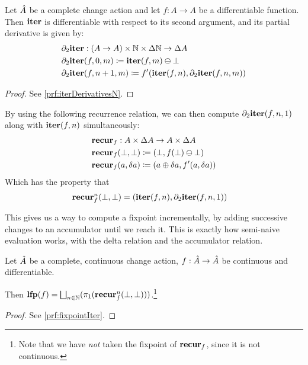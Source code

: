 \begin{prop}[name=Derivative of the iteration map with respect to $n$, restate=iterDerivativesN]
  \label{prop:iterDerivativesN}
  Let $\hat{A}$ be a complete change action and let $f: A \rightarrow A$ be a differentiable function. 
  Then $\mathbf{iter}$ is differentiable with respect to its second
  argument, and its partial derivative is given by:
  \begin{align*}
    &\partial_2{\mathbf{iter}}: (A \rightarrow A) \times \mathbb{N} \times \Delta \mathbb{N} \rightarrow \Delta A\\
    &\partial_2{\mathbf{iter}}(f, 0, m) \coloneqq \mathbf{iter}(f, m) \ominus \bot\\
    &\partial_2{\mathbf{iter}}(f, n+1, m) \coloneqq f'(\mathbf{iter}(f, n), \partial_2{\mathbf{iter}}(f, n, m))
  \end{align*}
\end{prop}
\ifproofs
\begin{proof}
  See \cref{prf:iterDerivativesN}.
\end{proof}
\fi

By using the following recurrence relation, 
we can then compute $\partial_2{\mathbf{iter}}(f, n, 1)$ along with $\mathbf{iter}(f, n)$ simultaneously:
\begin{align*}
  &\mathbf{recur}_f : A \times \Delta A \rightarrow A \times \Delta A\\
  &\mathbf{recur}_f (\bot, \bot) \coloneqq (\bot, f(\bot) \ominus \bot)\\
  &\mathbf{recur}_f (a, \delta a) \coloneqq (a \oplus \delta a, f'(a, \delta a))
\end{align*}
Which has the property that
\begin{align*}
  &\mathbf{recur}_f^n (\bot, \bot) = (\mathbf{iter}(f, n), \partial_2{\mathbf{iter}}(f, n, 1))
\end{align*}

This gives us a way to compute a fixpoint incrementally, by adding successive
changes to an accumulator until we reach it. This is exactly how
semi-naive evaluation works, with the delta relation and the accumulator relation.

\begin{thm}[name=Incremental computation of least fixpoints, restate=fixpointIter]
\label{thm:fixpointIter}
  Let $\hat{A}$ be a complete, continuous change action, $f: \hat{A} \rightarrow
  \hat{A}$ be continuous and differentiable.

  Then $\mathbf{lfp}(f) = \bigsqcup_{n \in \mathbb{N}}(\pi_1(\mathbf{recur}_f^n(\bot, \bot)))$.\footnote{
    Note that we have \emph{not} taken the fixpoint of $\mathbf{recur}_f$, since it is
    not continuous.}
\end{thm}
\ifproofs
\begin{proof}
  See \cref{prf:fixpointIter}.
\end{proof}
\fi


